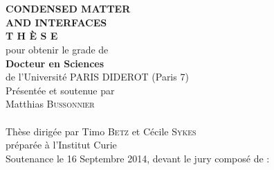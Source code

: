    \begin{center}
        \begin{minipage}{0.75\linewidth}
    \begin{center}
             \\ 
            \vspace*{0.3cm}
             \\
            \noindent \textbf{CONDENSED MATTER \\ AND INTERFACES} \\
            \vspace*{0.5cm}
            \noindent \Huge \textbf{T H È S E} \\
            \vspace*{0.3cm}
            \noindent \large {pour obtenir le grade de} \\
            \vspace*{0.3cm}
            \noindent \LARGE \textbf{Docteur en Sciences} \\
            \vspace*{0.3cm}
            \noindent \Large de l'Université PARIS DIDEROT (Paris 7) \\
            \vspace*{0.4cm}
            \noindent \large {Présentée et soutenue par\\}
            \noindent \LARGE Matthias \textsc{Bussonnier} \\
            \vspace*{0.8cm}
             \\
            \vspace*{0.8cm}
            \noindent \Large Thèse dirigée par Timo \textsc{Betz} et Cécile \textsc{Sykes} \\
            \vspace*{0.2cm}
            \noindent \Large préparée à l'Institut Curie \\
            \vspace*{0.2cm}
            \noindent \large Soutenance le 16 Septembre 2014, devant le jury composé de :\\
            \vspace*{0.5cm}

\end{center}
\end{minipage}
\end{center}
